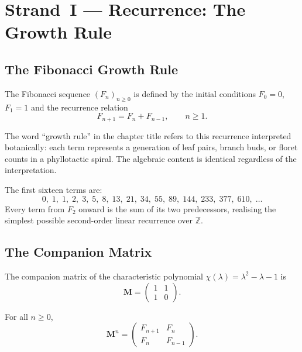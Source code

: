 \section{Strand~I — Recurrence: The Growth Rule}\label{sec:ch7-strand1}

\subsection{The Fibonacci Growth Rule}\label{subsec:ch7-growth}

\begin{definition}\label{def:fibonacci}
The Fibonacci sequence \((F_n)_{n \geq 0}\) is defined by the initial
conditions \(F_0 = 0\), \(F_1 = 1\) and the recurrence relation
\[
  F_{n+1} = F_n + F_{n-1}, \qquad n \geq 1.
\]
\end{definition}

\begin{remark}
The word ``growth rule'' in the chapter title refers to this recurrence
interpreted botanically: each term represents a generation of leaf pairs,
branch buds, or floret counts in a phyllotactic spiral.  The algebraic
content is identical regardless of the interpretation.
\end{remark}

The first sixteen terms are:
\[
  0,\;1,\;1,\;2,\;3,\;5,\;8,\;13,\;21,\;34,\;55,\;89,\;144,\;233,\;377,\;610,\;\ldots
\]
Every term from \(F_2\) onward is the sum of its two predecessors, realising
the simplest possible second-order linear recurrence over \(\mathbb{Z}\).

\subsection{The Companion Matrix}\label{subsec:ch7-companion}

\begin{definition}\label{def:companion}
The companion matrix of the characteristic polynomial
\(\chi(\lambda) = \lambda^2 - \lambda - 1\) is
\[
  \mathbf{M} = \begin{pmatrix} 1 & 1 \\ 1 & 0 \end{pmatrix}.
\]
\end{definition}

\begin{lemma}\label{lem:matrix-power}
For all \(n \geq 0\),
\[
  \mathbf{M}^n = \begin{pmatrix} F_{n+1} & F_n \\ F_n & F_{n-1} \end{pmatrix}.
\]
\end{lemma}

